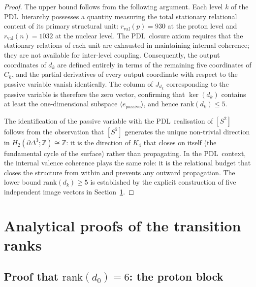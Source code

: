\documentclass[11pt,a4paper]{article}
\theoremstyle{definition}
\newcommand{\PDL}{\textnormal{PDL}}
\newcommand{\rval}{r_{\mathrm{val}}}
\newcommand{\Sfour}{\partial\Delta^3}
\newcommand{\rank}{\mathrm{rank}}
\newcommand{\dmap}[1]{d_{#1}}
\begin{document}
\begin{proof}
The upper bound follows from the following argument. Each level $k$ of the \PDL\ hierarchy possesses a quantity measuring the total stationary relational content of its primary structural unit: $\rval(p) = 930$ at the proton level and $\rval(n) = 1032$ at the nuclear level. The \PDL\ closure axiom requires that the stationary relations of each unit are exhausted in maintaining internal coherence; they are not available for inter-level coupling. Consequently, the output coordinates of $\dmap{k}$ are defined entirely in terms of the remaining five coordinates of $C_k$, and the partial derivatives of every output coordinate with respect to the passive variable vanish identically. The column of $J_{\dmap{k}}$ corresponding to the passive variable is therefore the zero vector, confirming that $\ker(\dmap{k})$ contains at least the one-dimensional subspace $\langle e_{\mathrm{passive}}\rangle$, and hence $\rank(\dmap{k}) \leq 5$.

The identification of the passive variable with the \PDL\ realisation of $[S^2]$ follows from the observation that $[S^2]$ generates the unique non-trivial direction in $H_2(\Sfour;\mathbb{Z}) \cong \mathbb{Z}$: it is the direction of $K_4$ that closes on itself (the fundamental cycle of the surface) rather than propagating. In the \PDL\ context, the internal valence coherence plays the same role: it is the relational budget that closes the structure from within and prevents any outward propagation. The lower bound $\rank(\dmap{k}) \geq 5$ is established by the explicit construction of five independent image vectors in Section~\ref{sec:proofs}.
\end{proof}

\section{Analytical proofs of the transition ranks}
\label{sec:proofs}

\subsection[Proof that rank(d₀) = 6: the proton block]{Proof that $\rank(\dmap{0}) = 6$: the proton block}
\label{subsec:rank_d0}
\end{document}
